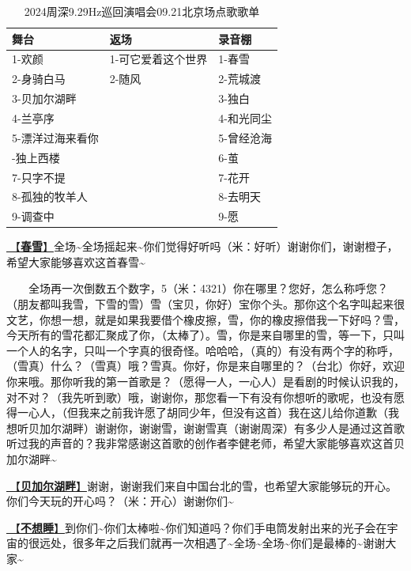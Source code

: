 \documentclass[]{ctexbook}
\begin{document}
\begin{table}

\caption{\label{tab:unnamed-chunk-93}2024周深9.29Hz巡回演唱会09.21北京场点歌歌单}
\centering
\begin{tabular}[t]{lll}
\toprule
舞台 & 返场 & 录音棚\\
\midrule
1-欢颜 & 1-可它爱着这个世界 & 1-春雪\\
2-身骑白马 & 2-随风 & 2-荒城渡\\
3-贝加尔湖畔 &  & 3-独白\\
4-兰亭序 &  & 4-和光同尘\\
5-漂洋过海来看你 &  & 5-曾经沧海\\
\addlinespace
6-独上西楼 &  & 6-茧\\
7-只字不提 &  & 7-花开\\
8-孤独的牧羊人 &  & 8-去明天\\
9-调查中 &  & 9-愿\\
\bottomrule
\end{tabular}
\end{table}

\hyperref[spring-snow]{🎵【\textbf{春雪}】}全场\textasciitilde 全场摇起来\textasciitilde 你们觉得好听吗（米：好听）谢谢你们，谢谢橙子，希望大家能够喜欢这首春雪\textasciitilde{}

  全场再一次倒数五个数字，5（米：4321）你在哪里？您好，怎么称呼您？（朋友都叫我雪，下雪的雪）雪（宝贝，你好）宝你个头。那你这个名字叫起来很文艺，你想一想，就是如果我要借个橡皮擦，雪，你的橡皮擦借我一下好吗？雪，今天所有的雪花都汇聚成了你，（太棒了）。雪，你是来自哪里的雪，等一下，只叫一个人的名字，只叫一个字真的很奇怪。哈哈哈，（真的）有没有两个字的称呼，（雪真）什么？（雪真）哦？雪真。你好，你是来自哪里的？（台北）你好，欢迎你来哦。那你听我的第一首歌是？（愿得一人，一心人）是看剧的时候认识我的，对不对？（我先听到歌）哦，谢谢你，那您看一下有没有你想听的歌呢，也没有愿得一心人，（但我来之前我许愿了胡同少年，但没有这首）我在这儿给你道歉（我想听贝加尔湖畔）谢谢你，谢谢雪，谢谢雪真（谢谢周深）有多少人是通过这首歌听过我的声音的？我非常感谢这首歌的创作者李健老师，希望大家能够喜欢这首贝加尔湖畔\textasciitilde{}

\hyperref[lake-baikal]{🎵【\textbf{贝加尔湖畔}】}谢谢，谢谢我们来自中国台北的雪，也希望大家能够玩的开心。你们今天玩的开心吗？（米：开心）谢谢你们\textasciitilde{}

\hyperref[keep-playing]{🎵【\textbf{不想睡}】}到你们\textasciitilde 你们太棒啦\textasciitilde 你们知道吗？你们手电筒发射出来的光子会在宇宙的很远处，很多年之后我们就再一次相遇了\textasciitilde 全场\textasciitilde 全场\textasciitilde 你们是最棒的\textasciitilde 谢谢大家\textasciitilde{}
\end{document}
